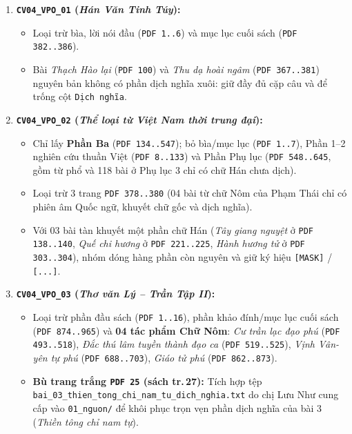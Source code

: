 \documentclass[11pt,a4paper]{article}
\begin{document}
\begin{enumerate}
    \item \textbf{\texttt{CV04\_VPO\_01} (\textit{Hán Văn Tinh Túy}):}
    \begin{itemize}
        \item Loại trừ bìa, lời nói đầu (\texttt{PDF 1..6}) và mục lục cuối sách (\texttt{PDF 382..386}).
        \item Bài \textit{Thạch Hào lại} (\texttt{PDF 100}) và \textit{Thu dạ hoài ngâm} (\texttt{PDF 367..381}) nguyên bản không có phần dịch nghĩa xuôi: giữ đầy đủ cặp câu và để trống cột \texttt{Dịch nghĩa}.
    \end{itemize}

    \item \textbf{\texttt{CV04\_VPO\_02} (\textit{Thể loại từ Việt Nam thời trung đại}):}
    \begin{itemize}
        \item Chỉ lấy \textbf{Phần Ba} (\texttt{PDF 134..547}); bỏ bìa/mục lục (\texttt{PDF 1..7}), Phần 1--2 nghiên cứu thuần Việt (\texttt{PDF 8..133}) và Phần Phụ lục (\texttt{PDF 548..645}, gồm từ phổ và 118 bài ở Phụ lục 3 chỉ có chữ Hán chưa dịch).
        \item Loại trừ 3 trang \texttt{PDF 378..380} (04 bài từ chữ Nôm của Phạm Thái chỉ có phiên âm Quốc ngữ, khuyết chữ gốc và dịch nghĩa).
        \item Với 03 bài tàn khuyết một phần chữ Hán (\textit{Tây giang nguyệt} ở \texttt{PDF 138..140}, \textit{Quế chi hương} ở \texttt{PDF 221..225}, \textit{Hành hương tử} ở \texttt{PDF 303..304}), nhóm dóng hàng phần còn nguyên và giữ ký hiệu \texttt{[MASK]} / \texttt{[...]}.
    \end{itemize}

    \item \textbf{\texttt{CV04\_VPO\_03} (\textit{Thơ văn Lý -- Trần Tập II}):}
    \begin{itemize}
        \item Loại trừ phần đầu sách (\texttt{PDF 1..16}), phần khảo đính/mục lục cuối sách (\texttt{PDF 874..965}) và \textbf{04 tác phẩm Chữ Nôm}: \textit{Cư trần lạc đạo phú} (\texttt{PDF 493..518}), \textit{Đắc thú lâm tuyền thành đạo ca} (\texttt{PDF 519..525}), \textit{Vịnh Vân-yên tự phú} (\texttt{PDF 688..703}), \textit{Giáo tử phú} (\texttt{PDF 862..873}).
        \item \textbf{Bù trang trắng \texttt{PDF 25} (sách tr.\,27):} Tích hợp tệp \texttt{bai\_03\_thien\_tong\_chi\_nam\_tu\_dich\_nghia.txt} do chị Lưu Như cung cấp vào \texttt{01\_nguon/} để khôi phục trọn vẹn phần dịch nghĩa của bài 3 (\textit{Thiền tông chỉ nam tự}).
    \end{itemize}
\end{enumerate}
\end{document}
